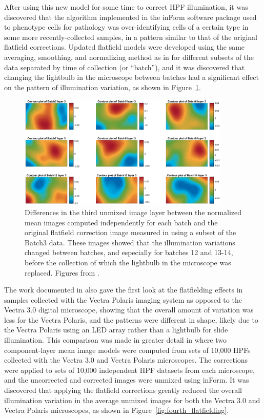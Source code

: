\documentclass[letterpaper,11pt]{article}
\newcommand{\reffig}[1]{Figure~\ref{#1}}
\begin{document}
After using this new model for some time to correct HPF illumination, it was discovered \cite{Ben_flatfielding_1} that the algorithm implemented in the inForm software package \cite{Kramer2018} used to phenotype cells for pathology was over-identifying cells of a certain type in some more recently-collected samples, in a pattern similar to that of the original flatfield corrections. Updated flatfield models were developed using the same averaging, smoothing, and normalizing method as in \cite{Alex_flatfielding_2} for different subsets of the data separated by time of collection (or ``batch''), and it was discovered that changing the lightbulb in the microscope between batches had a significant effect on the pattern of illumination variation, as shown in \reffig{fig:third_flatfielding}. 

\begin{figure}[!ht]
\centering
\includegraphics[width=0.9\textwidth]{images/introduction/third_flatfield_differences}
\caption{\footnotesize Differences in the third unmixed image layer between the normalized mean images computed independently for each batch and the original flatfield correction image measured in \cite{Alex_flatfielding_2} using a subset of the Batch3 data. These images showed that the illumination variations changed between batches, and especially for batches 12 and 13-14, before the collection of which the lightbulb in the microscope was replaced. Figures from \cite{Ben_flatfielding_1}.}
\label{fig:third_flatfielding}
\end{figure}

The work documented in \cite{Ben_flatfielding_1} also gave the first look at the flatfielding effects in samples collected with the Vectra Polaris imaging system as opposed to the Vectra 3.0 digital microscope, showing that the overall amount of variation was less for the Vectra Polaris, and the patterns were different in shape, likely due to the Vectra Polaris using an LED array rather than a lightbulb for slide illumination. This comparison was made in greater detail in \cite{Ben_flatfielding_2} where two component-layer mean image models were computed from sets of 10,000 HPFs collected with the Vectra 3.0 and Vectra Polaris microscopes. The corrections were applied to sets of 10,000 independent HPF datasets from each microscope, and the uncorrected and corrected images were unmixed using inForm. It was discovered that applying the flatfield corrections greatly reduced the overall illumination variation in the average unmixed images for both the Vectra 3.0 and Vectra Polaris microscopes, as shown in \reffig{fig:fourth_flatfielding}. 
\end{document}
